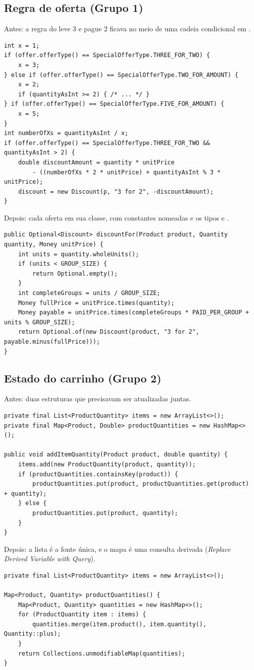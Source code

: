 \subsection{Regra de oferta (Grupo 1)}
Antes: a regra do leve 3 e pague 2 ficava no meio de uma cadeia condicional em .
\begin{lstlisting}
int x = 1;
if (offer.offerType() == SpecialOfferType.THREE_FOR_TWO) {
    x = 3;
} else if (offer.offerType() == SpecialOfferType.TWO_FOR_AMOUNT) {
    x = 2;
    if (quantityAsInt >= 2) { /* ... */ }
} if (offer.offerType() == SpecialOfferType.FIVE_FOR_AMOUNT) {
    x = 5;
}
int numberOfXs = quantityAsInt / x;
if (offer.offerType() == SpecialOfferType.THREE_FOR_TWO && quantityAsInt > 2) {
    double discountAmount = quantity * unitPrice
        - ((numberOfXs * 2 * unitPrice) + quantityAsInt % 3 * unitPrice);
    discount = new Discount(p, "3 for 2", -discountAmount);
}
\end{lstlisting}
Depois: cada oferta em sua classe, com constantes nomeadas e os tipos  e .
\begin{lstlisting}
public Optional<Discount> discountFor(Product product, Quantity quantity, Money unitPrice) {
    int units = quantity.wholeUnits();
    if (units < GROUP_SIZE) {
        return Optional.empty();
    }
    int completeGroups = units / GROUP_SIZE;
    Money fullPrice = unitPrice.times(quantity);
    Money payable = unitPrice.times(completeGroups * PAID_PER_GROUP + units % GROUP_SIZE);
    return Optional.of(new Discount(product, "3 for 2", payable.minus(fullPrice)));
}
\end{lstlisting}

\subsection{Estado do carrinho (Grupo 2)}
Antes: duas estruturas que precisavam ser atualizadas juntas.
\begin{lstlisting}
private final List<ProductQuantity> items = new ArrayList<>();
private final Map<Product, Double> productQuantities = new HashMap<>();

public void addItemQuantity(Product product, double quantity) {
    items.add(new ProductQuantity(product, quantity));
    if (productQuantities.containsKey(product)) {
        productQuantities.put(product, productQuantities.get(product) + quantity);
    } else {
        productQuantities.put(product, quantity);
    }
}
\end{lstlisting}
Depois: a lista é a fonte única, e o mapa é uma consulta derivada (\textit{Replace Derived Variable with Query}).
\begin{lstlisting}
private final List<ProductQuantity> items = new ArrayList<>();

Map<Product, Quantity> productQuantities() {
    Map<Product, Quantity> quantities = new HashMap<>();
    for (ProductQuantity item : items) {
        quantities.merge(item.product(), item.quantity(), Quantity::plus);
    }
    return Collections.unmodifiableMap(quantities);
}
\end{lstlisting}

